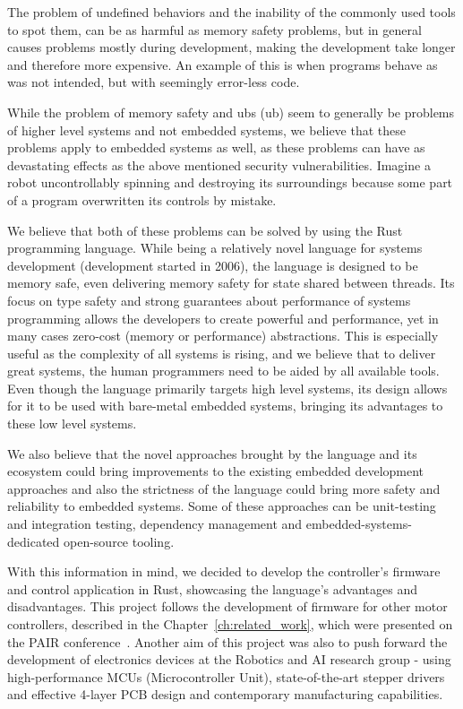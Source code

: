 The problem of undefined behaviors and the inability of the commonly used tools to spot them, can be as harmful as memory safety problems, but in general causes problems mostly during development, making the development take longer and therefore more expensive.
An example of this is when programs behave as was not intended, but with seemingly error-less code.

While the problem of memory safety and \acs{ub}s (\acl{ub}) seem to generally be problems of higher level systems and not embedded systems, we believe that these problems apply to embedded systems as well, as these problems can have as devastating effects as the above mentioned security vulnerabilities.
Imagine a robot uncontrollably spinning and destroying its surroundings because some part of a program overwritten its controls by mistake.

We believe that both of these problems can be solved by using the Rust programming language.
While being a relatively novel language for systems development (development started in 2006), the language is designed to be memory safe, even delivering memory safety for state shared between threads.
Its focus on type safety and strong guarantees about performance of systems programming allows the developers to create powerful and performance, yet in many cases zero-cost (memory or performance) abstractions.
This is especially useful as the complexity of all systems is rising, and we believe that to deliver great systems, the human programmers need to be aided by all available tools.
Even though the language primarily targets high level systems, its design allows for it to be used with bare-metal embedded systems, bringing its advantages to these low level systems.

We also believe that the novel approaches brought by the language and its ecosystem could bring improvements to the existing embedded development approaches and also the strictness of the language could bring more safety and reliability to embedded systems.
Some of these approaches can be unit-testing and integration testing, dependency management and embedded-systems-dedicated open-source tooling.

With this information in mind, we decided to develop the controller's firmware and control application in Rust, showcasing the language's advantages and disadvantages.
This project follows the development of firmware for other motor controllers, described in the Chapter~\ref{ch:related_work}, which were presented on the PAIR conference~\cite{faigl_program_nodate}.
Another aim of this project was also to push forward the development of electronics devices at the Robotics and AI research group - using high-performance MCUs (Microcontroller Unit), state-of-the-art stepper drivers and effective 4-layer PCB design and contemporary manufacturing capabilities.
